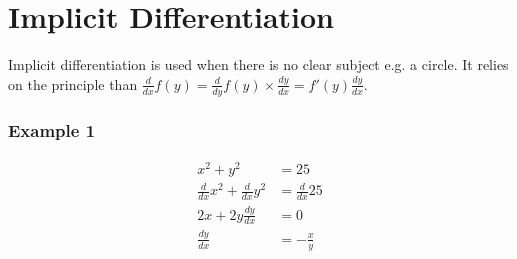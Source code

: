 \documentclass[class=article, crop=false]{standalone}
\begin{document}
\section*{Implicit Differentiation}
Implicit differentiation is used when there is no clear subject e.g. a circle. It relies on the principle than $\frac{d}{dx}f(y) = \frac{d}{dy}f(y) \times \frac{dy}{dx} = f'(y) \frac{dy}{dx}$.
\subsubsection*{Example 1}
\begin{align*}
x^2 + y^2 & = 25 \\
\frac{d}{dx}x^2 + \frac{d}{dx}y^2 & = \frac{d}{dx}25 \\
2x + 2y \frac{dy}{dx} & = 0 \\
\frac{dy}{dx} & = -\frac{x}{y} \\
\end{align*}
\end{document}
